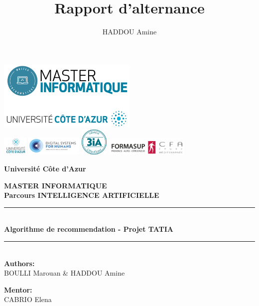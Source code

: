 \documentclass[a4paper,12pt]{article}
\title{\huge\bf  Rapport d'alternance}
\author{HADDOU Amine}
\begin{document}
\begin{titlepage}
    \begin{center}
        \includegraphics[width=0.5\textwidth]{./images/logo_master.png}\\
        \includegraphics[width=0.3\textwidth]{./images/DS4HlogocouleurFR.png} \hfill
        \includegraphics[width=0.10\textwidth]{./images/tampon-3IA.png} \hfill
        \textbf{\includegraphics[width=0.3\textwidth]{./images/cfa.png}} \\
        
        \vspace{1.5cm}
        
        \textbf{\LARGE Université C\^ote d'Azur}
        
        \vspace{0.5cm}
        
        \textbf{\Large MASTER INFORMATIQUE\\ Parcours INTELLIGENCE ARTIFICIELLE}
        
        \vspace{1.5cm}
        
        \rule{\linewidth}{0.5mm} \\[0.4cm]
        {\LARGE \bfseries Algorithme de recommendation - Projet TATIA\\[0.5cm] }
        \rule{\linewidth}{0.5mm} \\[1.5cm]
        
        \textbf{Authors:}\\ BOULLI Marouan \& HADDOU Amine \\
        
        \vspace{0.5cm}
        
        \textbf{Mentor:} \\
        CABRIO Elena\\
       
        
    \end{center}
\end{titlepage}
\end{document}
